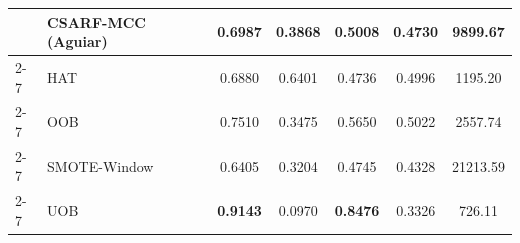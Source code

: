 \begin{table}[htbp]
{\begin{tabular}{|l|l|c|c|c|c|c|}
        & CSARF-MCC (Aguiar) & 0.6987 & 0.3868 & 0.5008 & 0.4730 & 9899.67 \\ \cline{2-7}
        & HAT & 0.6880 & 0.6401 & 0.4736 & 0.4996 & 1195.20 \\ \cline{2-7}
        & OOB & 0.7510 & 0.3475 & 0.5650 & 0.5022 & 2557.74 \\ \cline{2-7}
        & SMOTE-Window & 0.6405 & 0.3204 & 0.4745 & 0.4328 & 21213.59 \\ \cline{2-7}
        & UOB & \textbf{0.9143} & 0.0970 & \textbf{0.8476} & 0.3326 & 726.11 \\ \hline
    \end{tabular}%
    }
\end{table}